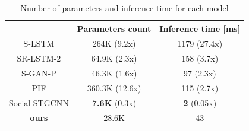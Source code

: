 \protect{}

\begin{table}[hbtp]
  \centering
  \caption{Number of parameters and inference time for each model\protect\footnotemark[6]}
  \label{tab:param-results}
  \begin{tabular}{c||c|c}
   & Parameters count & Inference time [ms] \\
  \hline\hline
  S-LSTM \cite{s-lstm} & 264K {\color{blue}(9.2x)} & 1179 {\color{blue}(27.4x)} \\
  \hline
  SR-LSTM-2 \cite{sr-lstm} & 64.9K {\color{blue}(2.3x)} & 158 {\color{blue}(3.7x)} \\
  \hline
  S-GAN-P \cite{gupta2018social-s-gan-p} & 46.3K {\color{blue}(1.6x)} & 97 {\color{blue}(2.3x)} \\
  \hline
  PIF \cite{liang2019peeking-pif} & 360.3K {\color{blue}(12.6x)} & 115 {\color{blue}(2.7x)} \\
  \hline
  Social-STGCNN \cite{s-stgcnn} & \textbf{7.6K} {\color{blue}(0.3x)} & \textbf{2} {\color{blue}(0.05x)} \\
  \hline \hline
  \textbf{ours} & 28.6K & 43 \\
  \hline 
  \end{tabular}
\end{table}

\protect{}

\newpage
